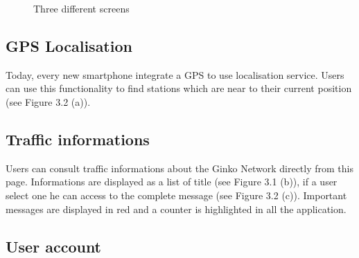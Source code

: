 \documentclass[a4paper, 12pt]{report}
\begin{document}
\begin{figure}[htp]

  \caption{Three different screens}
\end{figure}

\subsection{GPS Localisation}

Today, every new smartphone integrate a GPS to use localisation service. Users can use this functionality to find stations which are near to their current position (see Figure 3.2 (a)).


\subsection{Traffic informations}

Users can consult traffic informations about the Ginko Network directly from this page. Informations are displayed as a list of title (see Figure 3.1 (b)), if a user select one he can access to the complete message  (see Figure 3.2 (c)). Important messages are displayed in red and a counter is highlighted in all the application.



\subsection{User account}
\end{document}
